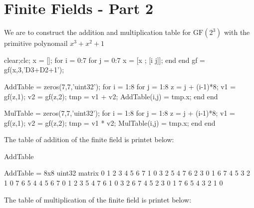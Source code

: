 \section{Finite Fields - Part 2}
\begin{par}
    \begin{flushleft}
    We are to construct the addition and multiplication table for $\mathrm{GF}\left(2^3 \right)$ with the primitive polynomail $x^3 +x^2 +1$
    \end{flushleft}
    \end{par}
    
    \begin{matlabcode}
    clear;clc;
    x = [];
    for i = 0:7
        for j = 0:7
            x = [x ; [i j]];
        end
    end
    gf = gf(x,3,'D3+D2+1');
    
    AddTable = zeros(7,7,'uint32');
    for i = 1:8
        for j = 1:8
            z = j +  (i-1)*8;
            v1 = gf(z,1);
            v2 = gf(z,2);
            tmp = v1 + v2;
            AddTable(i,j) = tmp.x;
        end
    end
    
    MulTable = zeros(7,7,'uint32');
    for i = 1:8
        for j = 1:8
            z = j +  (i-1)*8;
            v1 = gf(z,1);
            v2 = gf(z,2);
            tmp = v1 * v2;
            MulTable(i,j) = tmp.x;
        end
    end
    
    \end{matlabcode}
    
    \begin{par}
    \begin{flushleft}
    The table of addition of the finite field is printet below:
    \end{flushleft}
    \end{par}
    
    \begin{matlabcode}
    AddTable
    \end{matlabcode}
    \begin{matlaboutput}
    AddTable = 8x8 uint32 matrix    
       0   1   2   3   4   5   6   7
       1   0   3   2   5   4   7   6
       2   3   0   1   6   7   4   5
       3   2   1   0   7   6   5   4
       4   5   6   7   0   1   2   3
       5   4   7   6   1   0   3   2
       6   7   4   5   2   3   0   1
       7   6   5   4   3   2   1   0
    
    \end{matlaboutput}
    
    \begin{par}
    \begin{flushleft}
    The table of multiplication of the finite field is printet below:
    \end{flushleft}
    \end{par}
    
